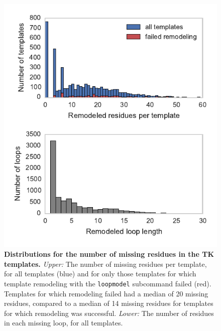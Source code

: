 \documentclass[aps,pre,twocolumn,nofootinbib,superscriptaddress,linenumbers]{revtex4-1}
\begin{document}
\begin{figure}[tbp]
    \includegraphics[width=\textwidth]{loopmodel_analysis/nmissing_resis_distributions.pdf}
    \caption{{\bf Distributions for the number of missing residues in the TK templates.}
    \color{red}
    \emph{Upper:} The number of missing residues per template, for all templates (blue) and for only those templates for which template remodeling with the {\tt loopmodel} subcommand failed (red).
    Templates for which remodeling failed had a median of 20 missing residues, compared to a median of 14 missing residues for templates for which remodeling was successful.
    \emph{Lower:} The number of residues in each missing loop, for all templates.    
}
    \label{figure:loopmodel-nmissing-residues}
\end{figure}
\end{document}
